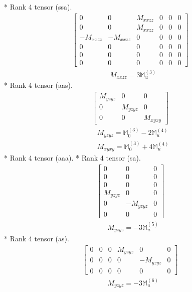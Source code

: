 \documentclass[fleqn,8pt,landscape]{jsarticle}
\begin{document}
* Rank 4 tensor (ssa).
\begin{align*}
\begin{bmatrix} 0 & 0 & M_{xxzz} & 0 & 0 & 0 \\ 0 & 0 & M_{xxzz} & 0 & 0 & 0 \\ - M_{xxzz} & - M_{xxzz} & 0 & 0 & 0 & 0 \\ 0 & 0 & 0 & 0 & 0 & 0 \\ 0 & 0 & 0 & 0 & 0 & 0 \\ 0 & 0 & 0 & 0 & 0 & 0 \end{bmatrix}
\end{align*}
\begin{align*}
& M_{xxzz} = 3 \mathbb{M}_{u}^{(3)}
\end{align*}
* Rank 4 tensor (aas).
\begin{align*}
\begin{bmatrix} M_{yzyz} & 0 & 0 \\ 0 & M_{yzyz} & 0 \\ 0 & 0 & M_{xyxy} \end{bmatrix}
\end{align*}
\begin{align*}
& M_{yzyz} = \mathbb{M}_{0}^{(3)} - 2 \mathbb{M}_{u}^{(4)} \\
& M_{xyxy} = \mathbb{M}_{0}^{(3)} + 4 \mathbb{M}_{u}^{(4)}
\end{align*}
* Rank 4 tensor (aaa).
* Rank 4 tensor (sa).
\begin{align*}
\begin{bmatrix} 0 & 0 & 0 \\ 0 & 0 & 0 \\ 0 & 0 & 0 \\ M_{yzyz} & 0 & 0 \\ 0 & - M_{yzyz} & 0 \\ 0 & 0 & 0 \end{bmatrix}
\end{align*}
\begin{align*}
& M_{yzyz} = - 3 \mathbb{M}_{u}^{(5)}
\end{align*}
* Rank 4 tensor (as).
\begin{align*}
\begin{bmatrix} 0 & 0 & 0 & M_{yzyz} & 0 & 0 \\ 0 & 0 & 0 & 0 & - M_{yzyz} & 0 \\ 0 & 0 & 0 & 0 & 0 & 0 \end{bmatrix}
\end{align*}
\begin{align*}
& M_{yzyz} = - 3 \mathbb{M}_{u}^{(6)}
\end{align*}
\end{document}
